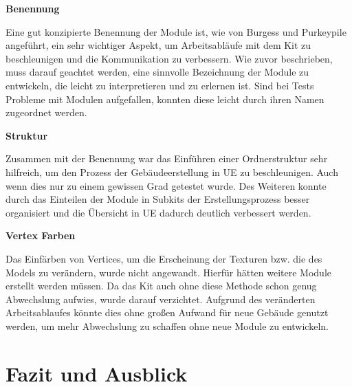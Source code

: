 \par\textbf{Benennung}\par
Eine gut konzipierte Benennung der Module ist, wie von Burgess und Purkeypile angeführt, ein sehr wichtiger Aspekt, um Arbeitsabläufe mit dem Kit zu beschleunigen und die Kommunikation zu verbessern. Wie zuvor beschrieben, muss darauf geachtet werden, eine sinnvolle Bezeichnung der Module zu entwickeln, die leicht zu interpretieren und zu erlernen ist. Sind bei Tests Probleme mit Modulen aufgefallen, konnten diese leicht durch ihren Namen zugeordnet werden.
\par\textbf{Struktur}\par
Zusammen mit der Benennung war das Einführen einer Ordnerstruktur sehr hilfreich, um den Prozess der Gebäudeerstellung in UE zu beschleunigen. Auch wenn dies nur zu einem gewissen Grad getestet wurde. Des Weiteren konnte durch das Einteilen der Module in Subkits der Erstellungsprozess besser organisiert und die Übersicht in UE dadurch deutlich verbessert werden.
\par\textbf{Vertex Farben}\par
Das Einfärben von Vertices, um die Erscheinung der Texturen bzw. die des Models zu verändern, wurde nicht angewandt. Hierfür hätten weitere Module erstellt werden müssen. Da das Kit auch ohne diese Methode schon genug Abwechslung aufwies, wurde darauf verzichtet. Aufgrund des veränderten Arbeitsablaufes könnte dies ohne großen Aufwand für neue Gebäude genutzt werden, um mehr Abwechslung zu schaffen ohne neue Module zu entwickeln.
\chapter{Fazit und Ausblick}
